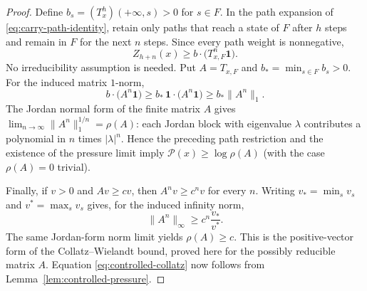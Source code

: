 \documentclass[11pt]{article}
\begin{document}
\begin{proof}
Define $b_s=(T_x^h)(+\infty,s)>0$ for $s\in F$.  In the path expansion of
\eqref{eq:carry-path-identity}, retain only paths that reach a state of $F$
after $h$ steps and remain in $F$ for the next $n$ steps.  Since every path
weight is nonnegative,
\[
 Z_{h+n}(x)\ge
 b\cdot\bigl(T_{x,F}^n\mathbf1\bigr).
\]
No irreducibility assumption is needed.  Put $A=T_{x,F}$ and
$b_*=\min_{s\in F}b_s>0$.  For the induced matrix $1$-norm,
\[
 b\cdot\bigl(A^n\mathbf1\bigr)
 \ge b_*\,\mathbf1\cdot\bigl(A^n\mathbf1\bigr)
 \ge b_*\lVert A^n\rVert_1.
\]
The Jordan normal form of the finite matrix $A$ gives
$\lim_{n\to\infty}\lVert A^n\rVert_1^{1/n}=\rho(A)$: each Jordan block with
eigenvalue $\lambda$ contributes a polynomial in $n$ times $|\lambda|^n$.
Hence the preceding path restriction and the existence of the pressure limit
imply
$\mathcal P(x)\ge\log\rho(A)$ (with the case $\rho(A)=0$ trivial).

Finally, if $v>0$ and $Av\ge cv$, then $A^nv\ge c^nv$ for every $n$.
Writing $v_* =\min_s v_s$ and $v^*=\max_s v_s$ gives, for the induced
infinity norm,
\[
 \lVert A^n\rVert_\infty
 \ge c^n\frac{v_*}{v^*}.
\]
The same Jordan-form norm limit yields $\rho(A)\ge c$.  This is
the positive-vector form of the Collatz--Wielandt bound, proved here for the
possibly reducible matrix $A$.  Equation \eqref{eq:controlled-collatz} now
follows from Lemma~\ref{lem:controlled-pressure}.
\end{proof}
\end{document}
